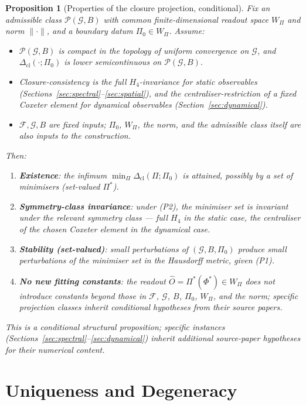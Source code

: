 \documentclass[12pt]{article}
\newtheorem{proposition}[theorem]{Proposition}
\newcommand{\Fcal}{\mathcal{F}}
\newcommand{\Pcal}{\mathcal{P}}
\newcommand{\Gcal}{\mathcal{G}}
\newcommand{\Dcl}{\Delta_{\mathrm{cl}}}
\begin{document}
\begin{proposition}[Properties of the closure projection, conditional]\label{prop:properties}
Fix an admissible class $\Pcal(\Gcal, B)$ with common finite-dimensional readout space $W_\Pi$ and norm $\|\cdot\|$, and a boundary datum $\Pi_0 \in W_\Pi$. Assume:
\begin{itemize}
    \item[\textup{(P1)}] $\Pcal(\Gcal, B)$ is compact in the topology of uniform convergence on $\Gcal$, and $\Dcl(\cdot;\Pi_0)$ is lower semicontinuous on $\Pcal(\Gcal, B)$.
    \item[\textup{(P2)}] Closure-consistency is the full $H_4$-invariance for static observables (Sections~\ref{sec:spectral}--\ref{sec:spatial}), and the centraliser-restriction of a fixed Coxeter element for dynamical observables (Section~\ref{sec:dynamical}).
    \item[\textup{(P3)}] $\Fcal, \Gcal, B$ are fixed inputs; $\Pi_0$, $W_\Pi$, the norm, and the admissible class itself are also inputs to the construction.
\end{itemize}
Then:
\begin{enumerate}
    \item \textbf{Existence}: the infimum $\min_{\Pi} \Dcl(\Pi;\Pi_0)$ is attained, possibly by a set of minimisers (set-valued $\Pi^*$).
    \item \textbf{Symmetry-class invariance}: under (P2), the minimiser set is invariant under the relevant symmetry class --- full $H_4$ in the static case, the centraliser of the chosen Coxeter element in the dynamical case.
    \item \textbf{Stability (set-valued)}: small perturbations of $(\Gcal, B, \Pi_0)$ produce small perturbations of the minimiser set in the Hausdorff metric, given (P1).
    \item \textbf{No new fitting constants}: the readout $\hat{O} = \Pi^*(\Phi^*) \in W_\Pi$ does not introduce constants beyond those in $\Fcal$, $\Gcal$, $B$, $\Pi_0$, $W_\Pi$, and the norm; specific projection classes inherit conditional hypotheses from their source papers.
\end{enumerate}
This is a conditional structural proposition; specific instances (Sections~\ref{sec:spectral}--\ref{sec:dynamical}) inherit additional source-paper hypotheses for their numerical content.
\end{proposition}

\section{Uniqueness and Degeneracy}\label{sec:uniqueness}
\end{document}
